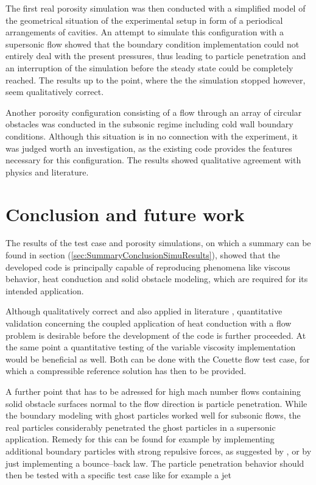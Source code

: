 \documentclass[11pt,a4paper,twoside]{report}
\begin{document}
The first real porosity simulation was then conducted with a simplified model of the geometrical situation of the experimental setup in form of a periodical arrangements of cavities. An attempt to simulate this configuration with a supersonic flow showed that the boundary condition implementation could not entirely deal with the present pressures, thus leading to particle penetration and an interruption of the simulation before the steady state could be completely reached. The results up to the point, where the the simulation stopped however, seem qualitatively correct. 

Another porosity configuration consisting of a flow through an array of circular obstacles was conducted in the subsonic regime including cold wall boundary conditions. Although this situation is in no connection with the experiment, it was judged worth an investigation, as the existing code provides the features necessary for this configuration. The results showed qualitative agreement with physics and literature.
 







 \chapter{Conclusion and future work}
\label{sec:conclusion}

The results of the test case and porosity simulations, on which a summary can be found in section (\ref{sec:SummaryConclusionSimuResults}), showed that the developed code is principally capable of reproducing phenomena like viscous behavior, heat conduction and solid obstacle modeling, which are required for its intended application.

Although qualitatively correct and also applied in literature \cite{Cleary2002}, quantitative validation concerning the coupled application of heat conduction with a flow problem is desirable before the development of the code is further proceeded. At the same point a quantitative testing of the variable viscosity implementation would be beneficial as well. Both can be done with the Couette flow test case, for which a compressible reference solution has then to be provided.

A further point that has to be adressed for high mach number flows containing solid obstacle surfaces normal to the flow direction is particle penetration. While the boundary modeling with ghost particles worked well for subsonic flows, the real particles considerably penetrated the ghost particles in a supersonic application. Remedy for this can be found for example by implementing additional boundary particles with strong repulsive forces, as suggested by \cite{Liu2002}, or by just implementing a bounce--back law. The particle penetration behavior should then be tested with a specific test case like for example a jet 
\end{document}
